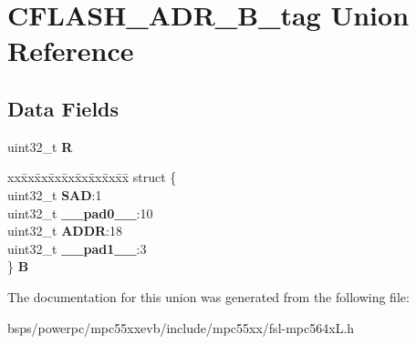 \hypertarget{unionCFLASH__ADR__32B__tag}{}\section{C\+F\+L\+A\+S\+H\+\_\+\+A\+D\+R\+\_\+B\+\_\+tag Union Reference}
\label{unionCFLASH__ADR__32B__tag}
\subsection*{Data Fields}
\begin{DoxyCompactItemize}
\item 
\mbox{\label{unionCFLASH__ADR__32B__tag_a670a5c4a7ef21f2dca88a5c90e6f9521}} 
uint32\+\_\+t {\bfseries R}
\item 
\mbox{\label{unionCFLASH__ADR__32B__tag_a6df6f17541ac1f58d2bb3fa93f34a51f}} 
\begin{tabbing}
xx\=xx\=xx\=xx\=xx\=xx\=xx\=xx\=xx\=\kill
struct \{\\
\>uint32\_t {\bfseries SAD}:1\\
\>uint32\_t {\bfseries \_\_pad0\_\_}:10\\
\>uint32\_t {\bfseries ADDR}:18\\
\>uint32\_t {\bfseries \_\_pad1\_\_}:3\\
\} {\bfseries B}\\

\end{tabbing}\end{DoxyCompactItemize}


The documentation for this union was generated from the following file\+:\begin{DoxyCompactItemize}
\item 
bsps/powerpc/mpc55xxevb/include/mpc55xx/fsl-\/mpc564x\+L.\+h\end{DoxyCompactItemize}
